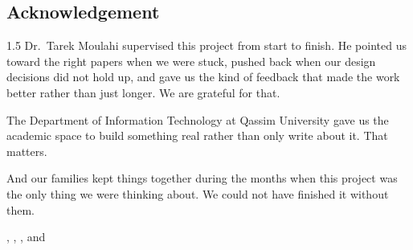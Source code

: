 \begin{center}
\section*{Acknowledgement}
\end{center}


\begin{spacing}{1.5}
Dr.\ Tarek Moulahi supervised this project from start to finish. He pointed us toward the right papers when we were stuck, pushed back when our design decisions did not hold up, and gave us the kind of feedback that made the work better rather than just longer. We are grateful for that.

The Department of Information Technology at Qassim University gave us the academic space to build something real rather than only write about it. That matters.

And our families kept things together during the months when this project was the only thing we were thinking about. We could not have finished it without them.
\end{spacing}

\begin{flushright}
{\firststudentname}, {\secondstudentname}, {\thirdstudentname}, and {\fourthstudentname}
\end{flushright}

\clearpage
\vspace*{2cm}
